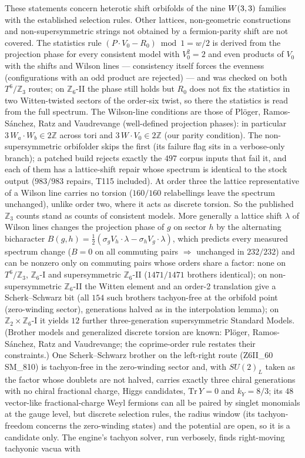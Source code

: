 \begin{boundary}
These statements concern heterotic shift orbifolds of the nine $W(3,3)$ families with the established selection rules. Other
lattices, non-geometric constructions and non-supersymmetric strings not obtained by a fermion-parity shift are not covered.
The statistics rule $(P\cdot V_0-R_0)\bmod1=w/2$ is derived from the projection phase for every consistent model with $V_0^2=2$ and
even products of $V_0$ with the shifts and Wilson lines --- consistency itself forces the evenness (configurations with an odd
product are rejected) --- and was checked on both $T^6/\mathbb Z_3$ routes; on $\mathbb Z_6$-II the phase still holds but $R_0$ does not fix
the statistics in two Witten-twisted sectors of the order-six twist, so there the statistics is read from the full spectrum. The Wilson-line conditions are those of Pl\"oger, Ramos-S\'anchez, Ratz and Vaudrevange (well-defined projection phases): in particular $3\,W_a\cdot W_b\in2\mathbb Z$ across tori and $3\,W\cdot V_0\in2\mathbb Z$ (our parity condition). The non-supersymmetric orbifolder skips the first (its failure flag sits in a verbose-only branch); a patched build rejects exactly the $497$ corpus inputs that fail it, and each of them has a lattice-shift repair whose spectrum is identical to the stock output ($983/983$ repairs, T115 included). At order three the lattice representative of a Wilson line carries no torsion ($160/160$ relabellings leave the spectrum unchanged), unlike order two, where it acts as discrete torsion. So the published $\mathbb Z_3$ counts stand as counts of consistent models. More generally a lattice shift $\lambda$ of Wilson lines changes the projection phase of $g$ on sector $h$ by the alternating bicharacter $B(g,h)=\tfrac12(\sigma_gV_h\cdot\lambda-\sigma_hV_g\cdot\lambda)$, which predicts every measured spectrum change ($B=0$ on all commuting pairs $\Rightarrow$ unchanged in $232/232$) and can be nonzero only on commuting pairs whose orders share a factor: none on $T^6/\mathbb Z_3$, $\mathbb Z_6$-I and supersymmetric $\mathbb Z_6$-II ($1471/1471$ brothers identical); on non-supersymmetric $\mathbb Z_6$-II the Witten element and an order-2 translation give a Scherk--Schwarz bit (all $154$ such brothers tachyon-free at the orbifold point (zero-winding sector), generations halved as in the interpolation lemma); on $\mathbb Z_2\times\mathbb Z_6$-I it yields $12$ further three-generation supersymmetric Standard Models. (Brother models and generalized discrete torsion are known: Pl\"oger, Ramos-S\'anchez, Ratz and Vaudrevange; the coprime-order rule restates their constraints.) One Scherk--Schwarz brother on the left-right route (Z6II\_60 SM\_810) is tachyon-free in the zero-winding sector and, with $SU(2)_L$ taken as the factor whose doublets are not halved, carries exactly three chiral generations with no chiral fractional charge, Higgs candidates, $\mathrm{Tr}\,Y=0$ and $k_Y=8/3$; its $48$ vector-like fractional-charge Weyl fermions can all be paired by singlet monomials at the gauge level, but discrete selection rules, the radius window (its tachyon-freedom concerns the zero-winding states) and the potential are open, so it is a candidate only. The engine's tachyon solver, run verbosely, finds right-moving tachyonic vacua with 
\end{boundary}
